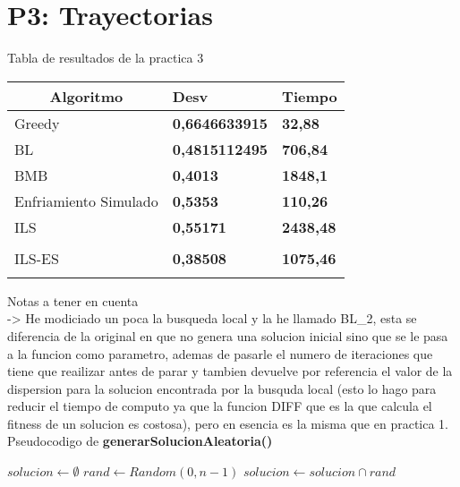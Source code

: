 \section{P3: Trayectorias}
Tabla de resultados de la practica 3 
\begin{table}[H]
  \begin{tabular}{|l|l|l|}
  \hline
  \multicolumn{1}{|c|}{Algoritmo}   & \multicolumn{1}{l|}{Desv}                   & \multicolumn{1}{c|}{Tiempo}          \\\hline
  Greedy                            & \textbf{0,6646633915}                       & \textbf{32,88}                       \\\hline
  BL                                & \textbf{0,4815112495}                       & \textbf{706,84}                      \\\hline
  BMB                               & \textbf{0,4013}                             & \textbf{1848,1}                      \\\hline
  Enfriamiento Simulado             & \textbf{0,5353}                             & \textbf{110,26}                      \\\hline
  ILS                               & \textbf{0,55171}                            & \textbf{2438,48}                     \\\hline                \\\hline
  ILS-ES                            & \textbf{0,38508}                            & \textbf{1075,46}                     \\\hline                                               \\\hline
  \end{tabular}
  \end{table}


  Notas a tener en cuenta\\
    -> He modiciado un poca la busqueda local y la he llamado BL_2, esta se diferencia de la original en que
    no genera una solucion inicial sino que se le pasa a la funcion como parametro, ademas de pasarle el numero de iteraciones 
    que tiene que reailizar antes de parar y tambien devuelve por referencia el valor de la dispersion para 
    la solucion encontrada por la busquda local (esto lo hago para reducir el tiempo de computo ya que
     la funcion DIFF que es la que calcula el fitness de un solucion es costosa), pero en esencia es la misma que en 
     practica 1. \\

  
     Pseudocodigo de \textbf{generarSolucionAleatoria()}
     \begin{algorithm}[H]
       \begin{algorithmic}[1]
          \State $solucion \gets \emptyset$
            \State $rand \gets Random(0,n-1)$
            \State $solucion \gets solucion \cap rand $ 
           \EndFor
           \State {}
         \EndFunction
       \end{algorithmic}
     \end{algorithm}

